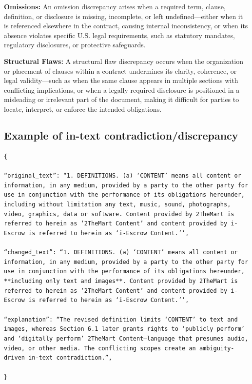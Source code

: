 \documentclass[11pt]{article}
\begin{document}
\begin{tcolorbox}[breakable,colback=lightestgray,colframe=black,title=\textbf{Eval\_3 L2: In-Text Discrepancy Detection Prompt}]
\textbf{Omissions:}
An omission discrepancy arises when a required term, clause, definition, or disclosure is missing, incomplete, or left undefined—either when it is referenced elsewhere in the contract, causing internal inconsistency, or when its absence violates specific U.S. legal requirements, such as statutory mandates, regulatory disclosures, or protective safeguards.

\textbf{Structural Flaws:}
A structural flaw discrepancy occurs when the organization or placement of clauses within a contract undermines its clarity, coherence, or legal validity—such as when the same clause appears in multiple sections with conflicting implications, or when a legally required disclosure is positioned in a misleading or irrelevant part of the document, making it difficult for parties to locate, interpret, or enforce the intended obligations.

\subsection*{\textbf{Example of in-text contradiction/discrepancy}}

{\footnotesize
\texttt{\{\\\\
``original\_text'': ``1. DEFINITIONS. (a) `CONTENT' means all content or information, in any medium, provided by a party to the other party for use in conjunction with the performance of its obligations hereunder, including without limitation any text, music, sound, photographs, video, graphics, data or software. Content provided by 2TheMart is referred to herein as `2TheMart Content' and content provided by i-Escrow is referred to herein as `i-Escrow Content.'',\\\\
``changed\_text'': ``1. DEFINITIONS. (a) `CONTENT' means all content or information, in any medium, provided by a party to the other party for use in conjunction with the performance of its obligations hereunder, **including only text and images**. Content provided by 2TheMart is referred to herein as `2TheMart Content' and content provided by i-Escrow is referred to herein as `i-Escrow Content.'',\\\\
``explanation'': ``The revised definition limits `CONTENT' to text and images, whereas Section 6.1 later grants rights to `publicly perform' and `digitally perform' 2TheMart Content—language that presumes audio, video, or other media. The conflicting scopes create an ambiguity-driven in-text contradiction.'',\\\\
\}}
}


\end{tcolorbox}
\end{document}
